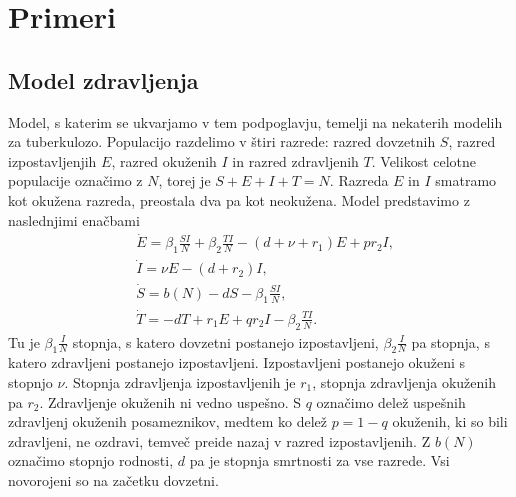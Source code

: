 \documentclass[a4paper,12pt]{article}
\begin{document}
\section{Primeri}
\subsection{Model zdravljenja}

Model, s katerim se ukvarjamo v tem podpoglavju, temelji na nekaterih modelih 
za tuberkulozo. Populacijo razdelimo v štiri razrede: razred dovzetnih \(S\), 
razred izpostavljenjih \(E\), razred okuženih \(I\) in razred zdravljenih \(T\). 
Velikost celotne populacije označimo z \(N\), torej je \(S+E+I+T=N\). Razreda \(E\) 
in \(I\) smatramo kot okužena razreda, preostala dva pa kot neokužena. 
Model predstavimo z naslednjimi enačbami
\begin{align*}
&\dot{E}=\beta_1\frac{SI}{N}+\beta_2\frac{TI}{N}-(d+\nu+r_1)E+pr_2I,\\
&\dot{I}=\nu E -(d+r_2)I,\\
&\dot{S}=b(N)-dS-\beta_1\frac{SI}{N},\\
&\dot{T}=-dT+r_1E+qr_2I-\beta_2\frac{TI}{N}.
\end{align*}
Tu je \(\beta_1\frac{I}{N}\) stopnja, s katero dovzetni postanejo izpostavljeni, 
\(\beta_2\frac{I}{N}\) pa stopnja, s katero zdravljeni postanejo izpostavljeni. 
Izpostavljeni postanejo okuženi s stopnjo \(\nu\). Stopnja zdravljenja izpostavljenih 
je \(r_1\), stopnja zdravljenja okuženih pa \(r_2\). Zdravljenje okuženih ni vedno uspešno. 
S \(q\) označimo delež uspešnih zdravljenj okuženih posameznikov, medtem ko delež \(p=1-q\) 
okuženih, ki so bili zdravljeni, ne ozdravi, temveč preide nazaj v razred izpostavljenih. 
Z \(b(N)\) označimo stopnjo rodnosti, \(d\) pa je stopnja smrtnosti za vse razrede. Vsi novorojeni 
so na začetku dovzetni. 
\end{document}
